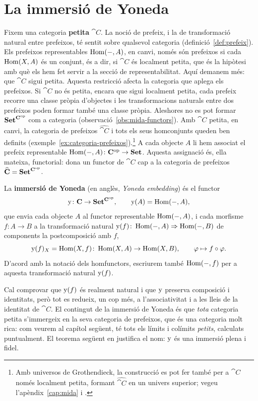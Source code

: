 \section{La immersió de Yoneda}

Fixem una categoria \textbf{petita} $\cat{C}$. La noció de prefeix, i la de transformació natural entre prefeixos, té sentit sobre qualsevol categoria (definició~\ref{def:prefeix}). Els prefeixos representables $\operatorname{Hom}(-,A)$, en canvi, només són prefeixos si cada $\operatorname{Hom}(X,A)$ és un conjunt, és a dir, si $\cat{C}$ és localment petita, que és la hipòtesi amb què els hem fet servir a la secció de representabilitat. Aquí demanem més: que $\cat{C}$ sigui petita. Aquesta restricció afecta la categoria que aplega els prefeixos. Si $\cat{C}$ no és petita, encara que sigui localment petita, cada prefeix recorre una classe pròpia d'objectes i les transformacions naturals entre dos prefeixos poden formar també una classe pròpia. Aleshores no es pot formar $\mathbf{Set}^{\mathbf{C}^{\mathrm{op}}}$ com a categoria (observació~\ref{obs:mida-functors}). Amb $\cat{C}$ petita, en canvi, la categoria de prefeixos $\widehat{\cat{C}}$ i tots els seus homconjunts queden ben definits (exemple~\ref{ex:categoria-prefeixos}).\footnote{Amb universos de Grothendieck, la construcció es pot fer també per a $\cat{C}$ només localment petita, formant $\widehat{\cat{C}}$ en un univers superior; vegeu l'apèndix~\ref{cap:mida} i \cite[§1.1]{riehl}.} A cada objecte $A$ li hem associat el prefeix representable $\operatorname{Hom}(-,A)\colon\mathbf{C}^{\mathrm{op}}\to\mathbf{Set}$. Aquesta assignació és, ella mateixa, functorial: dona un functor de $\cat{C}$ cap a la categoria de prefeixos $\widehat{\mathbf{C}}=\mathbf{Set}^{\mathbf{C}^{\mathrm{op}}}$.

\begin{definicio}
\label{def:immersio-yoneda}
La \textbf{immersió de Yoneda} (en anglès, \emph{Yoneda embedding}) és el functor
\[
\mathrm{y}\colon\mathbf{C}\to\mathbf{Set}^{\mathbf{C}^{\mathrm{op}}},
\qquad
\mathrm{y}(A)=\operatorname{Hom}(-,A),
\]
que envia cada objecte $A$ al functor representable $\operatorname{Hom}(-,A)$, i cada morfisme $f\colon A\to B$ a la transformació natural $\mathrm{y}(f)\colon\operatorname{Hom}(-,A)\Rightarrow\operatorname{Hom}(-,B)$ de components la postcomposició amb $f$,
\[
\mathrm{y}(f)_X=\operatorname{Hom}(X,f)\colon\operatorname{Hom}(X,A)\to\operatorname{Hom}(X,B),
\qquad
\varphi\mapsto f\circ\varphi.
\]
D'acord amb la notació dels homfunctors, escriurem també $\operatorname{Hom}(-,f)$ per a aquesta transformació natural $\mathrm{y}(f)$.
\end{definicio}

\begin{observacio}
Cal comprovar que $\mathrm{y}(f)$ és realment natural i que $\mathrm{y}$ preserva composició i identitats, però tot es redueix, un cop més, a l'associativitat i a les lleis de la identitat de $\cat{C}$. El contingut de la immersió de Yoneda és que \emph{tota} categoria petita s'immergeix en la seva categoria de prefeixos, que és una categoria molt rica: com veurem al capítol següent, té tots els límits i colímits \emph{petits}, calculats puntualment. El teorema següent en justifica el nom: $\mathrm{y}$ és una immersió plena i fidel.
\end{observacio}

